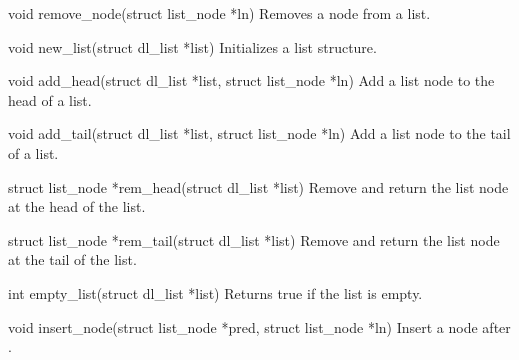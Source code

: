 \begin{cprototypelist}
  \item[void remove_node(struct list_node *ln)] Removes a node
  from a list.

  \item[void new_list(struct dl_list *list)] Initializes a list
  structure.

  \item[void add_head(struct dl_list *list, struct list_node *ln)]
  Add a list node to the head of a list.

  \item[void add_tail(struct dl_list *list, struct list_node *ln)]
  Add a list node to the tail of a list.

  \item[struct list_node *rem_head(struct dl_list *list)] Remove
  and return the list node at the head of the list.

  \item[struct list_node *rem_tail(struct dl_list *list)] Remove
  and return the list node at the tail of the list.

  \item[int empty_list(struct dl_list *list)] Returns true if the
  list is empty.

  \item[void insert_node(struct list_node *pred, struct list_node
  *ln)] Insert a node after .
\end{cprototypelist}



